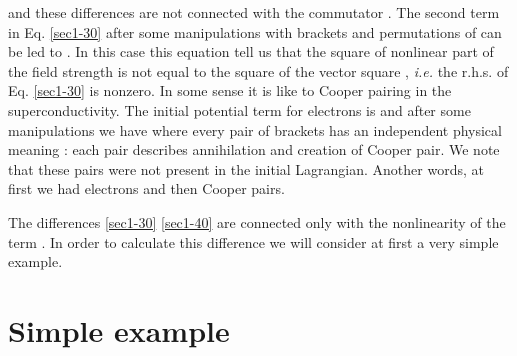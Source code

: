 \documentclass[a4paper,a4paper]{article}
\begin{document}
and these differences are not connected with the commutator  
\coordHE{}. The second term in Eq. \eqref{sec1-30} 
after some manipulations with 
brackets and permutations of \coordHE{} can be led to 
\coordHE{}. 
In this case this equation 
tell us that the square of nonlinear part \coordHE{} 
of the field strength is not equal to the square of the vector 
square \coordHE{}, 
\textit{i.e.} the r.h.s. of Eq. \eqref{sec1-30} is nonzero. 
In some sense it is like to Cooper pairing in the superconductivity. 
The initial potential term for electrons is 
\myHighlight{$\left (\hat\psi^+_\beta \left ( \hat\psi^+_\alpha \hat\psi_\alpha
\right ) \hat\psi_\beta \right )$}\coordHE{} and after some manipulations 
we have 
\myHighlight{$
\left (
\hat\psi_\alpha \hat\psi_\beta 
  \right ) 
\left (
\hat\psi^+_\gamma \hat\psi^+_\delta 
\right ) 
$}\coordHE{}
where every pair of brackets \myHighlight{$(\cdots )(\cdots )$}\coordHE{} has an independent 
physical meaning : each pair describes 
annihilation and creation of Cooper pair. We note that these pairs were 
not present in the initial Lagrangian. Another words, at first we had 
electrons and then Cooper pairs.  
\par 
The differences \eqref{sec1-30} \eqref{sec1-40} are connected only with 
the nonlinearity of the term \coordHE{}. In order to calculate 
this difference we will consider at first a very simple example. 

\section{Simple example}
\end{document}

